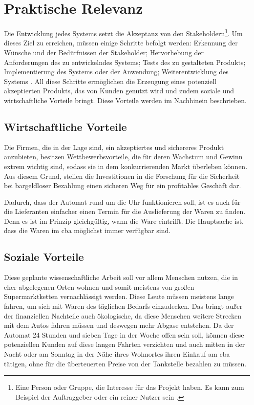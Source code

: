 \section{Praktische Relevanz}

Die Entwicklung jedes Systems setzt die Akzeptanz von den Stakeholdern\footnote{Eine Person oder Gruppe, die Interesse 
für das Projekt haben. Es kann zum Beispiel der Auftraggeber oder ein reiner Nutzer sein \cite{refip:HSSI}.}. Um dieses Ziel 
zu erreichen, müssen einige Schritte befolgt werden: Erkennung der Wünsche und der Bedürfnissen der Stakeholder; Hervorhebung 
der Anforderungen des zu entwickelndes Systems; Tests des zu gestalteten Produkts; Implementierung des Systems oder 
der Anwendung; Weiterentwicklung des Systems \cite{refbook:RECR}. All diese Schritte ermöglichen die Erzeugung eines 
potenziell akzeptierten Produkts, das von Kunden genutzt wird und zudem soziale und wirtschaftliche Vorteile bringt.
Diese Vorteile werden im Nachhinein beschrieben.


\subsection{Wirtschaftliche Vorteile}

Die Firmen, die in der Lage sind, ein akzeptiertes und sichereres Produkt anzubieten, besitzen Wettbewerbsvorteile, 
die für deren Wachstum und Gewinn extrem wichtig sind, sodass sie in dem konkurrierenden Markt überleben können. Aus 
diesem Grund, stellen die Investitionen in die Forschung für die Sicherheit bei bargeldloser Bezahlung einen sicheren 
Weg für ein profitables Geschäft dar.


Dadurch, dass der Automat rund um die Uhr funktionieren soll, ist es auch für die Lieferanten einfacher einen Termin 
für die Auslieferung der Waren zu finden. Denn es ist im Prinzip gleichgültig, wann die Ware eintrifft. Die Hauptsache 
ist, dass die Waren im \acrshort{cba} möglichst immer verfügbar sind. 


\subsection{Soziale Vorteile}

Diese geplante wissenschaftliche Arbeit soll vor allem Menschen nutzen, die in eher abgelegenen Orten wohnen und somit 
meistens von großen Supermarktketten vernachlässigt werden. Diese Leute müssen meistens lange fahren, um sich mit
Waren des täglichen Bedarfs einzudecken. Das bringt außer der finanziellen Nachteile auch ökologische, da diese Menschen 
weitere Strecken mit dem Autos fahren müssen und deswegen mehr Abgase entstehen. Da der Automat 24 Stunden und sieben Tage 
in der Woche offen sein soll, können diese potenziellen Kunden auf diese langen Fahrten verzichten und auch mitten in 
der Nacht oder am Sonntag in der Nähe ihres Wohnortes ihren Einkauf am \acrshort{cba} tätigen, ohne für die überteuerten
Preise von der Tankstelle bezahlen zu müssen. 

